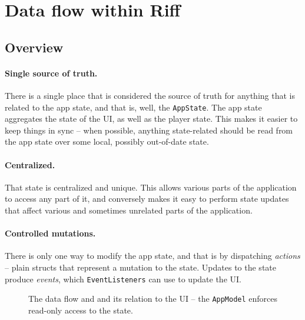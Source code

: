 \documentclass[12pt, a4paper]{article}
\begin{document}
\section{Data flow within Riff}

\subsection{Overview}

\paragraph{Single source of truth.} There is a single place that is considered the source of truth for anything that is related to the app state, and that is, well, the \texttt{AppState}. The app state aggregates the state of the UI, as well as the player state. This makes it easier to keep things in sync -- when possible, anything state-related should be read from the app state over some local, possibly out-of-date state.

\paragraph{Centralized.} That state is centralized and unique. This allows various parts of the application to access any part of it, and conversely makes it easy to perform state updates that affect various and sometimes unrelated parts of the application.

\paragraph{Controlled mutations.} There is only one way to modify the app state, and that is by dispatching \emph{actions} -- plain structs that represent a mutation to the state. Updates to the state produce \emph{events}, which \texttt{EventListeners} can use to update the UI.

\begin{figure}[!h]

    \centering


    \caption{The data flow and and its relation to the UI -- the \texttt{AppModel} enforces read-only access to the state.}
    \label{fig:flow}

\end{figure}
\end{document}
